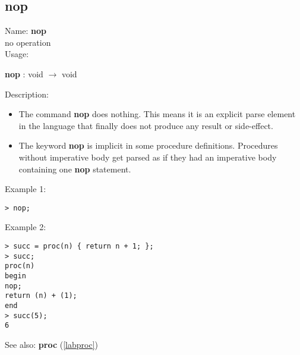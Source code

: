 \subsection{nop}
\label{labnop}
\noindent Name: \textbf{nop}\\
no operation\\
\noindent Usage: 
\begin{center}
\textbf{nop} : \textsf{void} $\rightarrow$ \textsf{void}
\end{center}
\noindent Description: \begin{itemize}

\item The command \textbf{nop} does nothing. This means it is an explicit parse
   element in the \sollya language that finally does not produce any
   result or side-effect.

\item The keyword \textbf{nop} is implicit in some procedure
   definitions. Procedures without imperative body get parsed as if they
   had an imperative body containing one \textbf{nop} statement.
\end{itemize}
\noindent Example 1: 
\begin{center}\begin{minipage}{15cm}\begin{Verbatim}[frame=single]
> nop;
\end{Verbatim}
\end{minipage}\end{center}
\noindent Example 2: 
\begin{center}\begin{minipage}{15cm}\begin{Verbatim}[frame=single]
> succ = proc(n) { return n + 1; };
> succ;
proc(n)
begin
nop;
return (n) + (1);
end
> succ(5);
6
\end{Verbatim}
\end{minipage}\end{center}
See also: \textbf{proc} (\ref{labproc})
